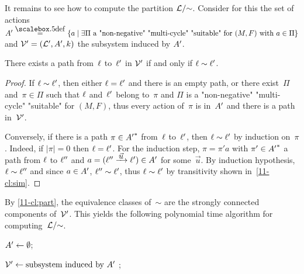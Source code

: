 \begin{scope}
\begin{algorithm}

\caption{$\text{cycle}(\?V,M,F)$}
\label{11-algo:zcycle}
\end{algorithm}

It remains to see how to compute the partition $\mathcal L/{\sim}$. Consider
for this the set of actions
$\Act'\eqdef\{a\mid\exists\Pi\text{ a "non-negative" "multi-cycle"
  "suitable" for $(M,F)$ with $a\in\Pi$}\}$ and
$\mathcal V'=(\mathcal L',A',k)$ the subsystem induced by $A'$.
\begin{claim}
\label{11-cl:part}
  There exists a path from~$\ell$ to~$\ell'$ in $\mathcal V'$
  if and only if $\ell\sim\ell'$.
\end{claim}
\begin{proof}
  If $\ell\sim\ell'$, then either $\ell=\ell'$ and there is an empty
  path, or there exist~$\Pi$ and~$\pi\in\Pi$ such that $\ell$
  and~$\ell'$ belong to~$\pi$ and $\Pi$ is a "non-negative"
  "multi-cycle" "suitable" for $(M,F)$, thus every action of~$\pi$ is
  in~$A'$ and there is a path in~$\mathcal V'$.  

  Conversely, if there is a path $\pi\in{A'}^\ast$ from~$\ell$
  to~$\ell'$, then $\ell\sim\ell'$ by induction on~$\pi$.  Indeed, if
  $|\pi|=0$ then $\ell=\ell'$.  For the induction step, $\pi=\pi' a$
  with $\pi'\in{A'}^\ast$ a path from $\ell$ to $\ell''$ and
  $a=(\loc''\step{\vec u}\loc')\in\Act'$ for some~$\vec u$.  By
  induction hypothesis, $\ell\sim\ell''$ and since $a\in A'$,
  $\ell''\sim\ell'$, thus $\ell\sim\ell'$ by transitivity shown
  in~\cref{11-cl:sim}. 
\end{proof}

By \cref{11-cl:part}, the equivalence classes of~$\sim$ are the
strongly connected components of~$\mathcal V'$.  This yields the following
polynomial time algorithm for computing~$\mathcal L/{\sim}$.

\begin{algorithm}

$A'\leftarrow\emptyset$;


$\mathcal V'\leftarrow \text{subsystem induced by~$A'$}$ ;

\caption{$\text{partition}(\?V,M,F)$}
\label{11-algo:part}
\end{algorithm}


\end{scope}
